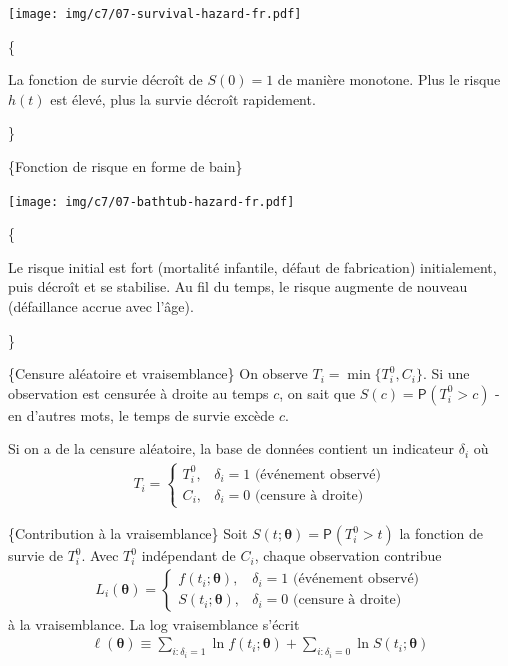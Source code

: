 \documentclass[
  11pt,
  letterpaper,
]{article}
\theoremstyle{definition}
\theoremstyle{definition}
\theoremstyle{definition}
\theoremstyle{definition}
\theoremstyle{remark}
\begin{document}
\begin{center}
\texttt{[image: img/c7/07-survival-hazard-fr.pdf]}
\end{center}

\{\footnotesize

La fonction de survie décroît de \(S(0)=1\) de manière monotone. Plus le risque \(h(t)\) est élevé, plus la survie décroît rapidement.

\}

\{Fonction de risque en forme de bain\}

\begin{center}
\texttt{[image: img/c7/07-bathtub-hazard-fr.pdf]}
\end{center}

\{\footnotesize

Le risque initial est fort (mortalité infantile, défaut de fabrication) initialement, puis décroît et se stabilise. Au fil du temps, le risque augmente de nouveau (défaillance accrue avec l'âge).

\}

\{Censure aléatoire et vraisemblance\}
On observe \(T_i = \min\{T_i^0, C_i\}\). Si une observation est censurée à droite au temps \(c\), on sait que \(S(c)={\mathsf P}_{}\left(T_i^0 > c\right)\)
- en d'autres mots, le temps de survie excède \(c\).

Si on a de la censure aléatoire, la base de données contient un indicateur \(\delta_i\) où
\begin{align*}
T_i = 
\begin{cases}
T_i^0, & \delta_i=1 \text{ (événement observé)}\\
C_i, & \delta_i=0 \text{ (censure à droite)}
\end{cases}
\end{align*}

\{Contribution à la vraisemblance\}
Soit \(S(t; \boldsymbol{\theta}) = {\mathsf P}_{}\left(T_{i}^0 > t\right)\) la fonction de survie de \(T_i^0\). Avec \(T_i^0\) indépendant de \(C_i\), chaque observation contribue
\begin{align*}
L_i(\boldsymbol{\theta}) = 
\begin{cases} 
f(t_i; \boldsymbol{\theta}), & \delta_i=1 \text{ (événement observé)}\\
S(t_i; \boldsymbol{\theta}), & \delta_i=0 \text{ (censure à droite)}
\end{cases}
\end{align*}
à la vraisemblance. La log vraisemblance s'écrit
\begin{align*}
\ell(\boldsymbol{\theta}) \equiv \sum_{i: \delta_i=1} \ln f(t_i; \boldsymbol{\theta}) + \sum_{i: \delta_i=0} \ln S(t_i; \boldsymbol{\theta})
\end{align*}
\end{document}
